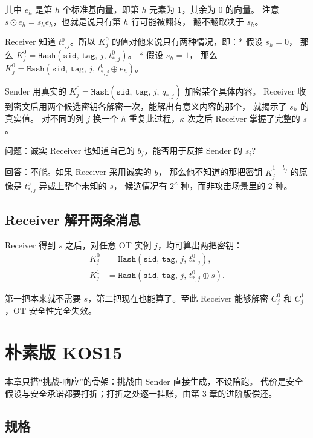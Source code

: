 其中 $e_{h}$ 是第 $h$ 个标准基向量，即第 $h$ 元素为 1，其余为 0 的向量。
注意 $s \odot e_{h} = s_{h} e_{h}$，也就是说只有第 $h$ 行可能被翻转，
翻不翻取决于 $s_h$。

Receiver 知道 $t^0_{*,j}$。所以 $K_j^0$ 的值对他来说只有两种情况，即：*
假设 $s_{h}=0$，
那么 $K^0_j=\mathtt{Hash}\left(\mathtt{sid},\,\mathtt{tag},\,j,\,t^0_{*,j}\right)$。
* 假设 $s_{h}=1$，
那么 $K^0_j=\mathtt{Hash}\left(\mathtt{sid},\,\mathtt{tag},\,j,\,t^0_{*,j} \oplus e_{h}\right)$。

Sender
用真实的 $K^0_j = \mathtt{Hash}\left(\mathtt{sid},\,\mathtt{tag},\,j,\,q_{*,j}\right)$ 加密某个具体内容。
Receiver 收到密文后用两个候选密钥各解密一次，能解出有意义内容的那个，
就揭示了 $s_{h}$ 的真实值。
对不同的列 $j$ 换一个 $h$ 重复此过程，$\kappa$ 次之后 Receiver
掌握了完整的 $s$。

问题：诚实 Receiver 也知道自己的 $b_j$，能否用于反推 Sender 的 $s_i$?

回答：不能。如果 Receiver 采用诚实的 $b$，
那么他不知道的那把密钥 $K_j^{1-b_j}$ 的原像是 $t^0_{*,j}$ 异或上整个未知的 $s$，
候选情况有 $2^\kappa$ 种，而非攻击场景里的 2 种。

\subsection{Receiver 解开两条消息}

Receiver 得到 $s$ 之后，对任意 OT 实例 $j$，均可算出两把密钥：
\begin{align}K^0_j &= \mathtt{Hash}\left(\mathtt{sid},\,\mathtt{tag},\,j,\,t^0_{*,j}\right),
\\
K^1_j &= \mathtt{Hash}\left(\mathtt{sid},\,\mathtt{tag},\,j,\,t^0_{*,j} \oplus s\right).
\end{align}

第一把本来就不需要 $s$，第二把现在也能算了。至此 Receiver
能够解密 $C^0_j$ 和 $C^1_j$，OT 安全性完全失效。

\section{朴素版 KOS15}

本章只搭“挑战-响应”的骨架：挑战由 Sender 直接生成，不设陪跑。
代价是安全假设与安全承诺都要打折；打折之处逐一挂账，由第 3
章的进阶版偿还。

\subsection{规格}

